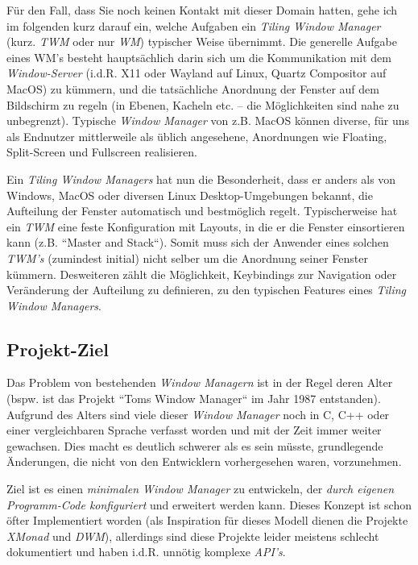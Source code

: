 \documentclass{article}
\begin{document}
Für den Fall, dass Sie noch keinen Kontakt mit dieser Domain hatten, gehe ich im folgenden kurz darauf ein,
welche Aufgaben ein \emph{Tiling Window Manager} (kurz. \emph{TWM} oder nur \emph{WM}) typischer Weise
übernimmt. Die generelle Aufgabe eines WM's besteht hauptsächlich darin sich um die Kommunikation mit dem
\emph{Window-Server} (i.d.R. X11 oder Wayland auf Linux, Quartz Compositor auf MacOS) zu kümmern, und die
tatsächliche Anordnung der Fenster auf dem Bildschirm zu regeln (in Ebenen, Kacheln etc. – die Möglichkeiten
sind nahe zu unbegrenzt). Typische \emph{Window Manager} von z.B. MacOS können diverse, für uns als Endnutzer
mittlerweile als üblich angesehene, Anordnungen wie Floating, Split-Screen und Fullscreen realisieren. \par
Ein \emph{Tiling Window Managers} hat nun die Besonderheit, dass er anders als von Windows, MacOS oder diversen
Linux Desktop-Umgebungen bekannt, die Aufteilung der Fenster automatisch und bestmöglich regelt. Typischerweise
hat ein \emph{TWM} eine feste Konfiguration mit Layouts, in die er die Fenster einsortieren kann (z.B. ``Master
and Stack``). Somit muss sich der Anwender eines solchen \emph{TWM's} (zumindest initial) nicht selber um die
Anordnung seiner Fenster kümmern. Desweiteren zählt die Möglichkeit, Keybindings zur Navigation oder Veränderung
der Aufteilung zu definieren, zu den typischen Features eines \emph{Tiling Window Managers}.

\subsection{Projekt-Ziel}

Das Problem von bestehenden \emph{Window Managern} ist in der Regel deren Alter (bspw. ist das Projekt ``Toms
Window Manager`` im Jahr 1987 entstanden). Aufgrund des Alters sind viele dieser \emph{Window Manager} noch in
C, C++ oder einer vergleichbaren Sprache verfasst worden und mit der Zeit immer weiter gewachsen. Dies macht es
deutlich schwerer als es sein müsste, grundlegende Änderungen, die nicht von den Entwicklern vorhergesehen waren,
vorzunehmen. \par
Ziel ist es einen \emph{minimalen Window Manager} zu entwickeln, der \emph{durch eigenen Programm-Code konfiguriert}
und erweitert werden kann. Dieses Konzept ist schon öfter Implementiert worden (als Inspiration für dieses Modell
dienen die Projekte \emph{XMonad\footnotemark} und \emph{DWM\footnotemark}), allerdings sind diese Projekte leider
meistens schlecht dokumentiert und haben i.d.R. unnötig komplexe \emph{API's}.
\end{document}
